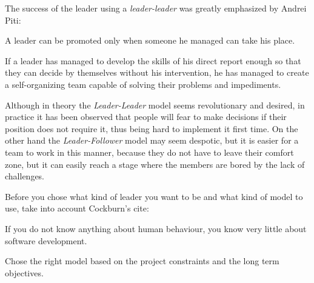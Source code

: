 The success of the leader using a \textit{leader-leader} was greatly emphasized by Andrei Piti:

\begin{displayquote}
A leader can be promoted only when someone he managed can take his place.
\end{displayquote}

If a leader has managed to develop the skills of his direct report enough so that they can decide by themselves without his intervention, he has managed to create a self-organizing team capable of solving their problems and impediments.

Although in theory the \textit{Leader-Leader} model seems revolutionary and desired, in practice it has been observed that people will fear to make decisions if their position does not require it, thus being hard to implement it first time. On the other hand the \textit{Leader-Follower} model may seem despotic, but it is easier for a team to work in this manner, because they do not have to leave their comfort zone, but it can easily reach a stage where the members are bored by the lack of challenges.

Before you chose what kind of leader you want to be and what kind of model to use, take into account Cockburn's cite:

\begin{displayquote}
If you do not know anything about human behaviour, you know very little about software development.
\end{displayquote}

Chose the right model based on the project constraints and the long term objectives.